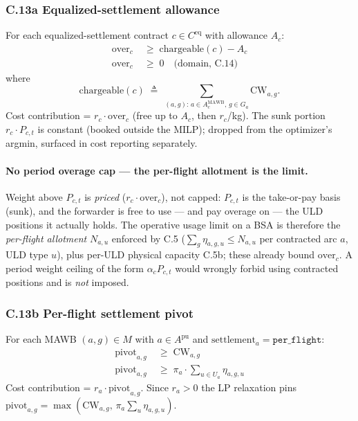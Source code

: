\documentclass[11pt,a4paper]{article}
\newcommand{\defeq}{\triangleq}
\theoremstyle{definition}
\begin{document}
\subsubsection*{C.13a Equalized-settlement allowance}

For each equalized-settlement contract $c \in C^{\text{eq}}$ with allowance $A_c$:
\begin{align}
  \text{over}_c &\;\geq\; \text{chargeable}(c) - A_c
    \tag{C.13a} \label{eq:C13a} \\
  \text{over}_c &\;\geq\; 0 \quad \text{(domain, C.14)}
\end{align}
where
\[
  \text{chargeable}(c) \;\defeq\; \sum_{(a, g) :\, a \in A_c^{\text{MAWB}},\, g \in G_a} \text{CW}_{a,g}.
\]
Cost contribution = $r_c \cdot \text{over}_c$ (free up to $A_c$, then $r_c$/kg).
The sunk portion $r_c \cdot P_{c,t}$ is constant (booked outside the MILP);
dropped from the optimizer's argmin, surfaced in cost reporting separately.

\paragraph{No period overage cap --- the per-flight allotment is the limit.}
Weight above $P_{c,t}$ is \emph{priced} ($r_c \cdot \text{over}_c$), not
capped: $P_{c,t}$ is the take-or-pay basis (sunk), and the forwarder is free
to use --- and pay overage on --- the ULD positions it actually holds. The
operative usage limit on a BSA is therefore the \emph{per-flight allotment}
$N_{a,u}$ enforced by C.5 ($\sum_g \eta_{a,g,u} \leq N_{a,u}$ per contracted
arc $a$, ULD type $u$), plus per-ULD physical capacity C.5b; these already
bound $\text{over}_c$. A period weight ceiling of the form $\alpha_c P_{c,t}$
would wrongly forbid using contracted positions and is \emph{not} imposed.

\subsubsection*{C.13b Per-flight settlement pivot}

For each MAWB $(a, g) \in M$ with $a \in A^{\text{pu}}$ and $\text{settlement}_a
= \texttt{per\_flight}$:
\begin{align}
  \text{pivot}_{a,g} &\;\geq\; \text{CW}_{a,g}
    \tag{C.13b-1} \label{eq:C13b-1} \\
  \text{pivot}_{a,g} &\;\geq\; \pi_a \cdot \sum_{u \in U_a} \eta_{a,g,u}
    \tag{C.13b-2} \label{eq:C13b-2}
\end{align}
Cost contribution = $r_a \cdot \text{pivot}_{a,g}$. Since $r_a > 0$ the LP
relaxation pins $\text{pivot}_{a,g} = \max(\text{CW}_{a,g},\, \pi_a \sum_u
\eta_{a,g,u})$.
\end{document}
